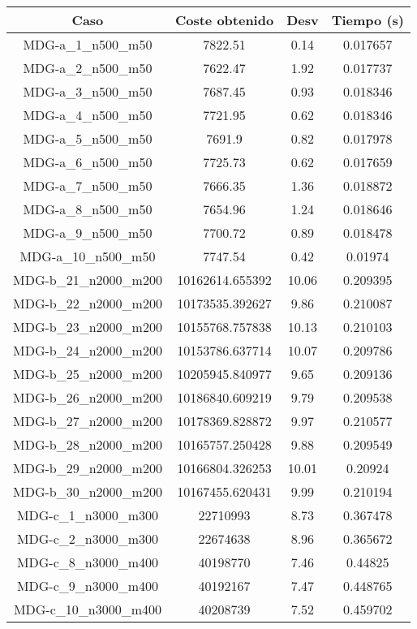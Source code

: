 \documentclass{article}
\begin{document}
\begin{table}[H]
	\centering
	\begin{tabular}{|cccc|}
		\hline
		Caso & Coste obtenido & Desv & Tiempo (s)\\ \hline
		MDG-a\_1\_n500\_m50 & 7822.51 & 0.14 & 0.017657\\
		MDG-a\_2\_n500\_m50 & 7622.47 & 1.92 & 0.017737\\
		MDG-a\_3\_n500\_m50 & 7687.45 & 0.93 & 0.018346\\
		MDG-a\_4\_n500\_m50 & 7721.95 & 0.62 & 0.018346\\
		MDG-a\_5\_n500\_m50 & 7691.9 & 0.82 & 0.017978\\
		MDG-a\_6\_n500\_m50 & 7725.73 & 0.62 & 0.017659\\
		MDG-a\_7\_n500\_m50 & 7666.35 & 1.36 & 0.018872\\
		MDG-a\_8\_n500\_m50 & 7654.96 & 1.24 & 0.018646\\
		MDG-a\_9\_n500\_m50 & 7700.72 & 0.89 & 0.018478\\
		MDG-a\_10\_n500\_m50 & 7747.54 & 0.42 & 0.01974\\
		MDG-b\_21\_n2000\_m200 & 10162614.655392 & 10.06 & 0.209395\\
		MDG-b\_22\_n2000\_m200 & 10173535.392627 & 9.86 & 0.210087\\
		MDG-b\_23\_n2000\_m200 & 10155768.757838 & 10.13 & 0.210103\\
		MDG-b\_24\_n2000\_m200 & 10153786.637714 & 10.07 & 0.209786\\
		MDG-b\_25\_n2000\_m200 & 10205945.840977 & 9.65 & 0.209136\\
		MDG-b\_26\_n2000\_m200 & 10186840.609219 & 9.79 & 0.209538\\
		MDG-b\_27\_n2000\_m200 & 10178369.828872 & 9.97 & 0.210577\\
		MDG-b\_28\_n2000\_m200 & 10165757.250428 & 9.88 & 0.209549\\
		MDG-b\_29\_n2000\_m200 & 10166804.326253 & 10.01 & 0.20924\\
		MDG-b\_30\_n2000\_m200 & 10167455.620431 & 9.99 & 0.210194\\
		MDG-c\_1\_n3000\_m300 & 22710993 & 8.73 & 0.367478\\
		MDG-c\_2\_n3000\_m300 & 22674638 & 8.96 & 0.365672\\
		MDG-c\_8\_n3000\_m400 & 40198770 & 7.46 & 0.44825\\
		MDG-c\_9\_n3000\_m400 & 40192167 & 7.47 & 0.448765\\
		MDG-c\_10\_n3000\_m400 & 40208739 & 7.52 & 0.459702\\

\end{tabular}
\end{table}
\end{document}

